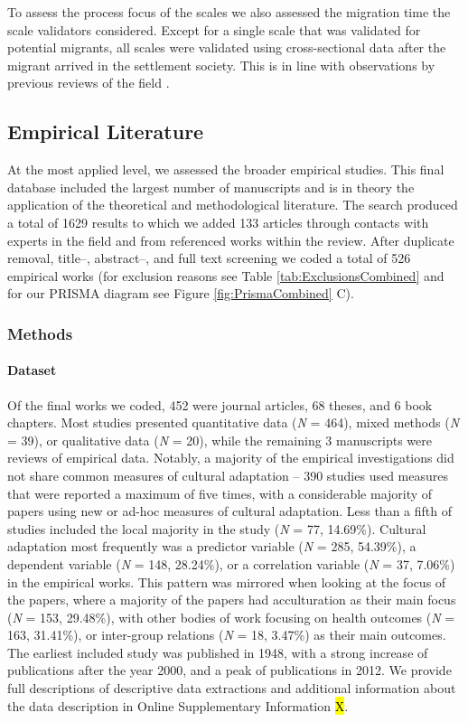 To assess the process focus of the scales we also assessed the migration
time the scale validators considered. Except for a single scale that was
validated for potential migrants, all scales were validated using
cross-sectional data after the migrant arrived in the settlement
society. This is in line with observations by previous reviews of the
field \citep[e.g.,][]{Brown2011}.

\subsection{Empirical Literature}

At the most applied level, we assessed the broader empirical studies.
This final database included the largest number of manuscripts and is in
theory the application of the theoretical and methodological literature.
The search produced a total of 1629 results to which we added 133
articles through contacts with experts in the field and from referenced
works within the review. After duplicate removal, title--, abstract--,
and full text screening we coded a total of 526 empirical works (for
exclusion reasons see Table \ref{tab:ExclusionsCombined} and for our
PRISMA diagram see Figure \ref{fig:PrismaCombined} C).

\subsubsection{Methods}

\paragraph{Dataset}

Of the final works we coded, 452 were journal articles, 68 theses, and 6
book chapters. Most studies presented quantitative data (\textit{N} =
464), mixed methods (\textit{N} = 39), or qualitative data (\textit{N} =
20), while the remaining 3 manuscripts were reviews of empirical data.
Notably, a majority of the empirical investigations did not share common
measures of cultural adaptation -- 390 studies used measures that were
reported a maximum of five times, with a considerable majority of papers
using new or ad-hoc measures of cultural adaptation. Less than a fifth
of studies included the local majority in the study (\textit{N} = 77,
14.69\%). Cultural adaptation most frequently was a predictor variable
(\textit{N} = 285, 54.39\%), a dependent variable (\textit{N} = 148,
28.24\%), or a correlation variable (\textit{N} = 37, 7.06\%) in the
empirical works. This pattern was mirrored when looking at the focus of
the papers, where a majority of the papers had acculturation as their
main focus (\textit{N} = 153, 29.48\%), with other bodies of work
focusing on health outcomes (\textit{N} = 163, 31.41\%), or inter-group
relations (\textit{N} = 18, 3.47\%) as their main outcomes. The earliest
included study was published in 1948, with a strong increase of
publications after the year 2000, and a peak of publications in 2012. We
provide full descriptions of descriptive data extractions and additional
information about the data description in Online Supplementary
Information \hl{X}.

